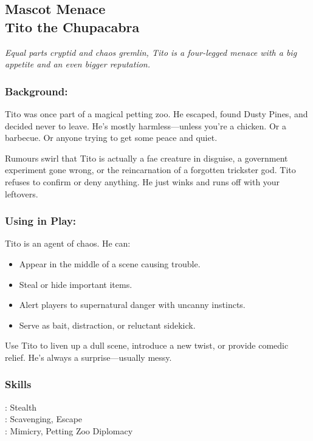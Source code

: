 
\newpage

\subsection{{\small Mascot Menace}\\ Tito the Chupacabra}
\label{npc:tito-chupacabra}

\emph{Equal parts cryptid and chaos gremlin, Tito is a four-legged menace with a big appetite and an even bigger reputation.}
\vspace{.5\baselineskip}

\begin{paracol}{3}
    \subsubsection*{Background:}
    Tito was once part of a magical petting zoo. He escaped, found Dusty Pines, and decided never to leave. He’s mostly harmless—unless you're a chicken. Or a barbecue. Or anyone trying to get some peace and quiet.

    Rumours swirl that Tito is actually a fae creature in disguise, a government experiment gone wrong, or the reincarnation of a forgotten trickster god. Tito refuses to confirm or deny anything. He just winks and runs off with your leftovers.

    \switchcolumn
    \subsubsection*{Using in Play:}
    Tito is an agent of chaos. He can:
    \begin{itemize}
      \item Appear in the middle of a scene causing trouble.
      \item Steal or hide important items.
      \item Alert players to supernatural danger with uncanny instincts.
      \item Serve as bait, distraction, or reluctant sidekick.
    \end{itemize}
    Use Tito to liven up a dull scene, introduce a new twist, or provide comedic relief. He’s always a surprise—usually messy.

    \switchcolumn
    \subsubsection{Skills}
      \noindent\Expert: Stealth \\
      \noindent\Skilled: Scavenging, Escape \\
      \noindent\Novice: Mimicry, Petting Zoo Diplomacy \\

\end{paracol}
